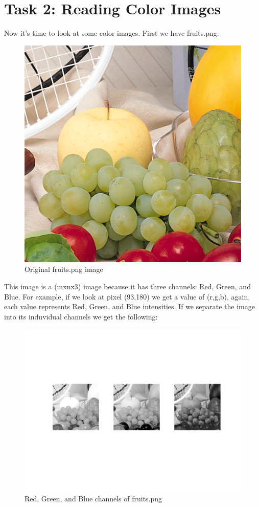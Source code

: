 \section{Task 2: Reading Color Images}

Now it's time to look at some color images. First we have fruits.png:

\begin{figure}[H]
    \centering
    \includegraphics[scale=0.5]{fruits}
    \caption{Original fruits.png image}
\end{figure}

This image is a (mxnx3) image because it has three channels: Red, Green, and
Blue. For example, if we look at pixel (93,180) we get a value of (r,g,b),
again, each value represents Red, Green, and Blue intensities. If we separate
the image into its induvidual channels we get the following:

\begin{figure}[H]
    \centering
    \includegraphics[scale=0.5]{threeChannels}
    \caption{Red, Green, and Blue channels of fruits.png}
\end{figure}

